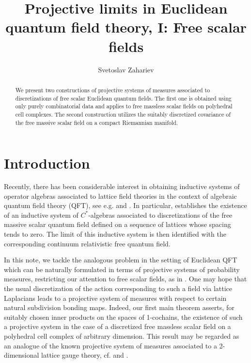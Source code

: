 \documentclass[11pt,reqno]{amsart}
\numberwithin{equation}{section}
\theoremstyle{remark}
\theoremstyle{rmdefinition}
\begin{document}
\title[Projective limits]{Projective limits in Euclidean quantum field theory, I: Free scalar fields}

\author{Svetoslav Zahariev}
\address{MEC Department, LaGuardia Community College of The City University of New York, 31-10 Thomson Ave., Long Island City, NY 11101, U.S.A.}

\maketitle
\begin{abstract}
We present two constructions of projective systems of measures associated to discretizations of free scalar Euclidean quantum fields. The first one is obtained using only purely combinatorial data and applies to free massless scalar fields on polyhedral cell complexes. The second construction utilizes the suitably discretized covariance of the free massive scalar field on a compact Riemannian manifold.
\end{abstract}

\section{Introduction}
Recently, there has been considerable interest in obtaining inductive systems of operator algebras associated to lattice field theories in the context of algebraic quantum field theory (QFT), see e.g. \cite{LSW} and \cite{MMST}. In particular, \cite{MMST} establishes the existence of an inductive system of $C^*$-algebras associated to discretizations of the free massive scalar quantum field defined on a sequence of lattices whose spacing tends to zero. The limit of this inductive system is then identified with the corresponding continuum relativistic free quantum field. 

In this note, we tackle the analogous problem in the setting of Euclidean QFT which can be naturally formulated in terms of projective systems of probability measures, restricting our attention to free scalar fields, as in \cite{MMST}. One may hope that the usual discretization of the action corresponding to such a field via lattice Laplacians leads to a projective system of measures with respect to certain natural subdivision bonding maps. Indeed, our first main theorem asserts, for suitably chosen inner products on the spaces of 1-cochains, the existence of such a projective system in the case of a discretized free massless scalar field on a polyhedral cell complex of arbitrary dimension. This result may be regarded as an analogue of the known projective system of measures associated to a 2-dimensional lattice gauge theory, cf. \cite{KK} and \cite{VM}.
\end{document}
